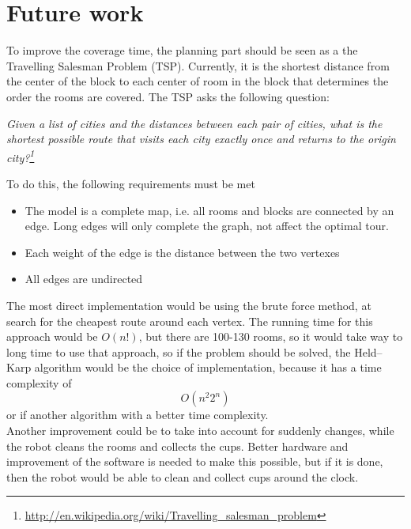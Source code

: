 \documentclass[11pt,a4paper]{article}
\begin{document}
\newpage


\newpage


\newpage


\newpage

\section{Future work}
To improve the coverage time, the planning part should be seen as a the Travelling Salesman Problem (TSP). Currently, it is the shortest distance from the center of the block to each center of room in the block that determines the order the rooms are covered. The TSP asks the following question:
\begin{center}
\textit{Given a list of cities and the distances between each pair of cities, what is the shortest possible route that visits each city exactly once and returns to the origin city?\footnote{\url{http://en.wikipedia.org/wiki/Travelling_salesman_problem}}}
\end{center} 
To do this, the following requirements must be met
\begin{itemize}\itemsep-2pt
\item The model is a complete map, i.e. all rooms and blocks are connected by an edge. Long edges will only complete the graph, not affect the optimal tour.
\item Each weight of the edge is the distance between the two vertexes 
\item All edges are undirected
\end{itemize}   
The most direct implementation would be using the brute force method, at search for the cheapest route around each vertex. The running time for this approach would be $O(n!)$, but there are 100-130 rooms, so it would take way to long time to use that approach, so if the problem should be solved, the Held--Karp algorithm would be the choice of implementation, because it has a time complexity of
$$O(n^2 2^n)$$
or if another algorithm with a better time complexity. \\[0.2cm]
Another improvement could be to take into account for suddenly changes, while the robot cleans the rooms and collects the cups. Better hardware and improvement of the software is needed to make this possible, but if it is done, then the robot would be able to clean and collect cups around the clock.  
\end{document}
